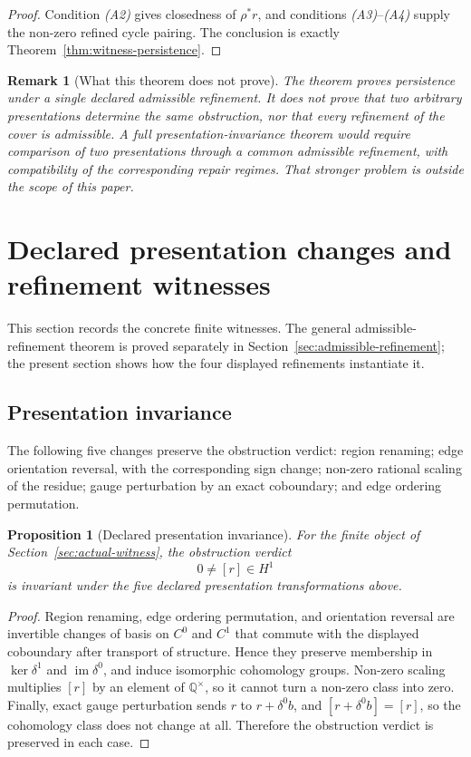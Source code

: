 \documentclass[11pt]{article}
\newtheorem{proposition}[theorem]{Proposition}
\newtheorem{remark}[theorem]{Remark}
\newcommand{\im}{\operatorname{im}}
\newcommand{\Q}{\mathbb{Q}}
\begin{document}
\begin{proof}
Condition \emph{(A2)} gives closedness of \(\rho^*r\), and conditions \emph{(A3)}--\emph{(A4)} supply the non-zero refined cycle pairing. The conclusion is exactly Theorem~\ref{thm:witness-persistence}.
\end{proof}

\begin{remark}[What this theorem does not prove]
The theorem proves persistence under a single declared admissible refinement. It does not prove that two arbitrary presentations determine the same obstruction, nor that every refinement of the cover is admissible. A full presentation-invariance theorem would require comparison of two presentations through a common admissible refinement, with compatibility of the corresponding repair regimes. That stronger problem is outside the scope of this paper.
\end{remark}

\section{Declared presentation changes and refinement witnesses}
\label{sec:invariance-refinement}

This section records the concrete finite witnesses. The general admissible-refinement theorem is proved separately in Section~\ref{sec:admissible-refinement}; the present section shows how the four displayed refinements instantiate it.

\subsection{Presentation invariance}

The following five changes preserve the obstruction verdict: region renaming; edge orientation reversal, with the corresponding sign change; non-zero rational scaling of the residue; gauge perturbation by an exact coboundary; and edge ordering permutation.

\begin{proposition}[Declared presentation invariance]
For the finite object of Section~\ref{sec:actual-witness}, the obstruction verdict
\[
0\neq [r]\in H^1
\]
is invariant under the five declared presentation transformations above.
\end{proposition}

\begin{proof}
Region renaming, edge ordering permutation, and orientation reversal are invertible changes of basis on \(C^0\) and \(C^1\) that commute with the displayed coboundary after transport of structure. Hence they preserve membership in \(\ker\delta^1\) and \(\im\delta^0\), and induce isomorphic cohomology groups. Non-zero scaling multiplies \([r]\) by an element of \(\Q^\times\), so it cannot turn a non-zero class into zero. Finally, exact gauge perturbation sends \(r\) to \(r+\delta^0b\), and \([r+\delta^0b]=[r]\), so the cohomology class does not change at all. Therefore the obstruction verdict is preserved in each case.
\end{proof}
\end{document}
